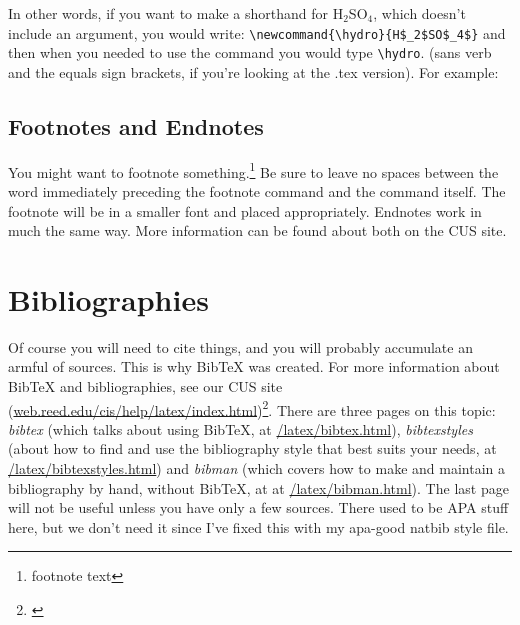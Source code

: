 \documentclass[12pt,twoside]{reedthesis}
\begin{document}
In other words, if you want to make a shorthand for H$_2$SO$_4$, which doesn't include an argument, you would write: \verb=\newcommand{\hydro}{H$_2$SO$_4$}= and then when you needed  to use the command you would type \verb=\hydro=. (sans verb and the equals sign brackets, if you're looking at the .tex version). For example: \hydro

\subsection{Footnotes and Endnotes}
	You might want to footnote something.\footnote{footnote text} Be sure to leave no spaces between the word immediately preceding the footnote command and the command itself. The footnote will be in a smaller font and placed appropriately. Endnotes work in much the same way. More information can be found about both on the CUS site.
	
\section{Bibliographies}
	Of course you will need to cite things, and you will probably accumulate an armful of sources. This is why BibTeX was created. For more information about BibTeX and bibliographies, see our CUS site (\url{web.reed.edu/cis/help/latex/index.html})\footnote{\cite{reedweb:2007}}. There are three pages on this topic: {\it bibtex} (which talks about using BibTeX, at \url{/latex/bibtex.html}), {\it bibtexstyles} (about how to find and use the bibliography style that best suits your needs, at \url{/latex/bibtexstyles.html}) and {\it bibman} (which covers how to make and maintain a bibliography by hand, without BibTeX, at at \url{/latex/bibman.html}). The last page will not be useful unless you have only a few sources. There used to be APA stuff here, but we don't need it since I've fixed this with my apa-good natbib style file.
	
\end{document}
